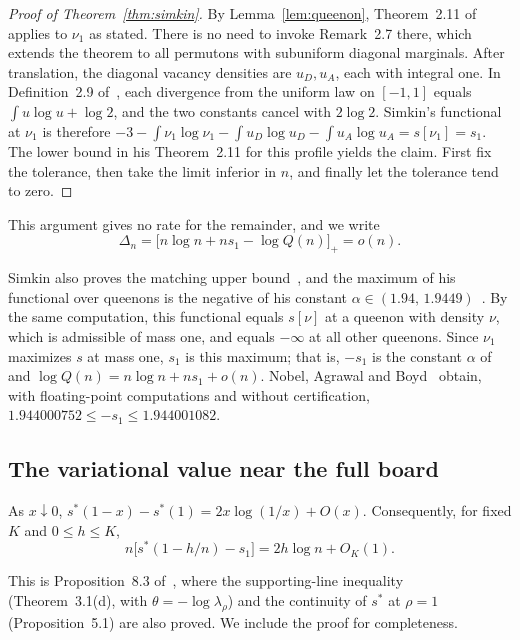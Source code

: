 \begin{proof}[Proof of Theorem~\ref{thm:simkin}] By Lemma~\ref{lem:queenon}, Theorem~2.11 of~\cite{Simkin}
applies to $\nu_1$
as stated. There is no need to invoke Remark~2.7 there,
which extends the theorem to all permutons with subuniform diagonal marginals. After translation, the
diagonal vacancy densities are
$u_D,u_A$, each with integral one. In Definition~2.9 of~\cite{Simkin}, each divergence from the uniform law
on $[-1,1]$ equals $\int
u\log
u+\log2$, and the two constants cancel with $2\log2$. Simkin's functional at $\nu_1$ is therefore
$-3-\int\nu_1\log\nu_1-\int
u_D\log u_D-\int u_A\log
u_A=s[\nu_1]=s_1$. The lower bound in his Theorem~2.11 for this profile yields the claim. First fix the
tolerance, then take the limit inferior in $n$, and finally let the tolerance tend to zero. \end{proof}

This argument gives no rate for the remainder, and we write \begin{equation}\label{eq:Delta}
 \Delta_n=\bigl[n\log n+ns_1-\log Q(n)\bigr]_+=o(n).
\end{equation}

Simkin also proves the matching upper bound~\cite[Theorem~1.1]{Simkin}, and the maximum of his functional
over queenons is the
negative of his constant $\alpha\in(1.94,\,1.9449)$~\cite[Section~2]{Simkin}. By the same computation, this
functional equals $s[\nu]$
at a queenon with density $\nu$, which is admissible of mass one, and equals $-\infty$ at all other
queenons. Since $\nu_1$ maximizes
$s$ at mass one, $s_1$ is this maximum; that is, $-s_1$ is the constant $\alpha$ of~\cite{Simkin} and
$\log Q(n)=n\log n+ns_1+o(n)$. Nobel, Agrawal and Boyd~\cite{NAB} obtain, with floating-point computations
and without
certification, $1.944000752\le-s_1\le1.944001082$.

\subsection{The variational value near the full board}

\begin{lema}\label{lem:borde} As $x\downarrow0$, $s^*(1-x)-s^*(1)=2x\log(1/x)+O(x)$. Consequently, for fixed
$K$ and $0\le h\le K$, \[
 n\bigl[s^*(1-h/n)-s_1\bigr]=2h\log n+O_K(1).
\] \end{lema}

This is Proposition~8.3 of~\cite{Perfil}, where the supporting-line inequality (Theorem~3.1(d), with
$\theta=-\log\lambda_\rho$) and the continuity of $s^*$ at $\rho=1$ (Proposition~5.1) are also proved. We
include the proof for completeness.

